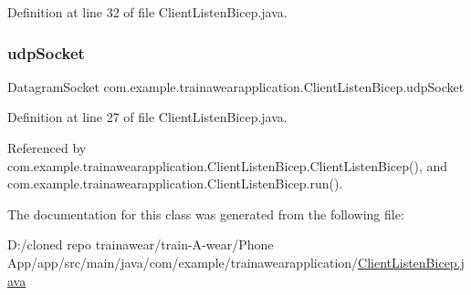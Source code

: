 Definition at line 32 of file Client\+Listen\+Bicep.\+java.

\mbox{\label{classcom_1_1example_1_1trainawearapplication_1_1_client_listen_bicep_aa43b7aebe53f1efa443f014fe5efc7ab}} 
\subsubsection{\texorpdfstring{udpSocket}{udpSocket}}
{\footnotesize\ttfamily Datagram\+Socket com.\+example.\+trainawearapplication.\+Client\+Listen\+Bicep.\+udp\+Socket\hspace{0.3cm}{\ttfamily [private]}}



Definition at line 27 of file Client\+Listen\+Bicep.\+java.



Referenced by com.\+example.\+trainawearapplication.\+Client\+Listen\+Bicep.\+Client\+Listen\+Bicep(), and com.\+example.\+trainawearapplication.\+Client\+Listen\+Bicep.\+run().



The documentation for this class was generated from the following file\+:\begin{DoxyCompactItemize}
\item 
D\+:/cloned repo trainawear/train-\/\+A-\/wear/\+Phone App/app/src/main/java/com/example/trainawearapplication/\mbox{\hyperlink{_client_listen_bicep_8java}{Client\+Listen\+Bicep.\+java}}\end{DoxyCompactItemize}
